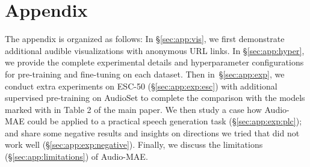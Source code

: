 \documentclass{article}
\begin{document}
\vspace{2em}
\appendix

\section*{Appendix}
The appendix is organized as follows: 
In \S\ref{sec:app:vis}, we first demonstrate additional audible visualizations with anonymous URL links. 
In \S\ref{sec:app:hyper}, we provide the complete experimental details and hyperparameter configurations for pre-training and fine-tuning on each dataset.
Then in~\S\ref{sec:app:exp}, we conduct extra experiments on ESC-50 (\S\ref{sec:app:exp:esc}) with additional supervised pre-training on AudioSet to complete the comparison with the models marked with \textsuperscript{} in Table 2 of the main paper.
We then study a case how Audio-MAE could be applied to a practical speech generation task (\S\ref{sec:app:exp:plc}); and share some negative results and insights on directions we tried that did not work well (\S\ref{sec:app:exp:negative}). 
Finally, we discuss the limitations (\S\ref{sec:app:limitations}) 
of Audio-MAE.
\end{document}
